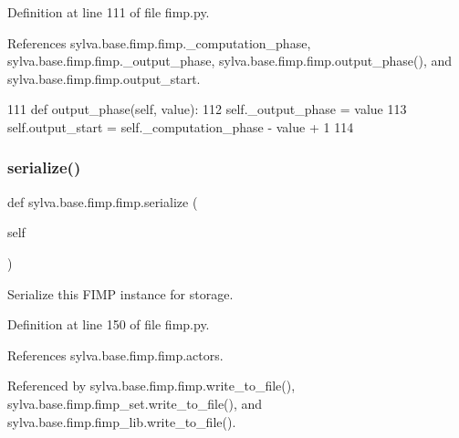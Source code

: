 Definition at line 111 of file fimp.\+py.



References sylva.\+base.\+fimp.\+fimp.\+\_\+computation\+\_\+phase, sylva.\+base.\+fimp.\+fimp.\+\_\+output\+\_\+phase, sylva.\+base.\+fimp.\+fimp.\+output\+\_\+phase(), and sylva.\+base.\+fimp.\+fimp.\+output\+\_\+start.


\begin{DoxyCode}
111     \textcolor{keyword}{def }output\_phase(self, value):
112       self.\_output\_phase = value
113       self.output\_start = self.\_computation\_phase - value + 1
114 
\end{DoxyCode}
\mbox{\label{classsylva_1_1base_1_1fimp_1_1fimp_a1b1f25751dbb9d953496580d5c9b876d}} 
\subsubsection{\texorpdfstring{serialize()}{serialize()}}
{\footnotesize\ttfamily def sylva.\+base.\+fimp.\+fimp.\+serialize (\begin{DoxyParamCaption}\item[{}]{self }\end{DoxyParamCaption})}

\begin{DoxyVerb}  Serialize this FIMP instance for storage.
\end{DoxyVerb}
 

Definition at line 150 of file fimp.\+py.



References sylva.\+base.\+fimp.\+fimp.\+actors.



Referenced by sylva.\+base.\+fimp.\+fimp.\+write\+\_\+to\+\_\+file(), sylva.\+base.\+fimp.\+fimp\+\_\+set.\+write\+\_\+to\+\_\+file(), and sylva.\+base.\+fimp.\+fimp\+\_\+lib.\+write\+\_\+to\+\_\+file().


